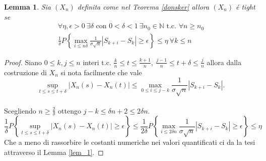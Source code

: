 \documentclass[11pt, twoside]{report}
\theoremstyle{definition}
\theoremstyle{plain}
\newtheorem{lemma}[teo]{Lemma}
\theoremstyle{remark}
\numberwithin{equation}{chapter}
\begin{document}
\begin{lemma}\label{lem_2} Sia $(X_n)$ definita come nel Teorema \ref{donsker} allora $(X_n)$ \'e tight se 
\begin{gather}
\forall \eta, \epsilon >0 \ \exists \delta \text{ con }  0< \delta <1 \  \exists n_0 \in \mathbb N \text{ t.c. }  \forall n\geq n_0 \nonumber \\
 \frac{1}{\delta}P\left\{\max\limits_{i \leq n \delta}\frac{1}{\sigma \sqrt n}|S_{k+i}-S_k|\geq \epsilon \right\} \leq \eta \ \forall k\leq n
\end{gather}
\end{lemma}

\begin{proof}Siano $0\leq k, j \leq n $ interi t.c. $\frac{k}{n}\leq t \leq \frac{k+1}{n}, \  \frac{j-1}{n}\leq t+\delta \leq \frac{j}{n}$ allora dalla costruzione di $X_n$ si nota facilmente che vale 
$$\sup\limits_{t\leq s\leq t+\delta} |X_n(s)-X_n(t)| \leq \max\limits_{0\leq i\leq j-k}\frac{1}{\sigma \sqrt n}|S_{k+i}-S_k|.$$ \\
Scegliendo $n\geq \frac{2}{\delta}$ ottengo $j-k\leq \delta n +2\leq 2 \delta n$. \\
$$\frac{1}{\delta}P\left\{\sup\limits_{t\leq s\leq t+\delta}|X_n(s)-X_n(t)|\geq \epsilon \right\} \leq \frac{1}{2 \delta}P\left\{\max\limits_{i \leq 2 \delta n}\frac{1}{\sigma \sqrt n}|S_{k+i}-S_k|\geq \epsilon \right\} \leq \eta $$
Che a meno di rassorbire le costanti numeriche nei valori quantificati ci da la tesi attraverso il Lemma \ref{lem_1}.

\end{proof}
\end{document}
